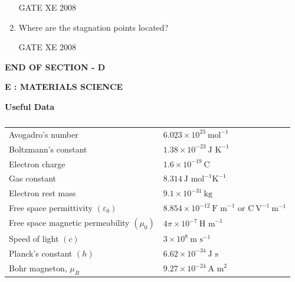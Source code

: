 \documentclass[12pt]{article}
\begin{document}
\begin{enumerate}[label=Q\arabic*.]
GATE XE 2008

\item Where are the stagnation points located?  

\begin{enumerate}[label=(\Alph*)]
\end{enumerate}

GATE XE 2008
\end{enumerate}
\begin{center}
    \textbf{END OF SECTION - D}
\end{center}

\newpage

\begin{center}
    \textbf{\Large E : MATERIALS SCIENCE}
\end{center}

\textbf{Useful Data}

   \begin{table}[H]     \centering     \caption{}     \label{}     \begin{tabular}{ll}
Avogadro's number & $6.023 \times 10^{23} \ \text{mol}^{-1}$ \\
Boltzmann's constant & $1.38 \times 10^{-23} \ \text{J K}^{-1}$ \\
Electron charge & $1.6 \times 10^{-19} \ \text{C}$ \\
Gas constant & $8.314 \ \text{J mol}^{-1} \text{K}^{-1}$ \\
Electron rest mass & $9.1 \times 10^{-31} \ \text{kg}$ \\
Free space permittivity $(\varepsilon_0)$ & $8.854 \times 10^{-12} \ \text{F m}^{-1}$ or $\text{C} \ \text{V}^{-1} \ \text{m}^{-1}$ \\
Free space magnetic permeability $(\mu_0)$ & $4\pi \times 10^{-7} \ \text{H m}^{-1}$ \\
Speed of light $(c)$ & $3 \times 10^{8} \ \text{m s}^{-1}$ \\
Planck's constant $(h)$ & $6.62 \times 10^{-34} \ \text{J s}$ \\
Bohr magneton, $\mu_B$ & $9.27 \times 10^{-24} \ \text{A m}^2$ \\
\end{tabular} \end{table}
\end{document}
